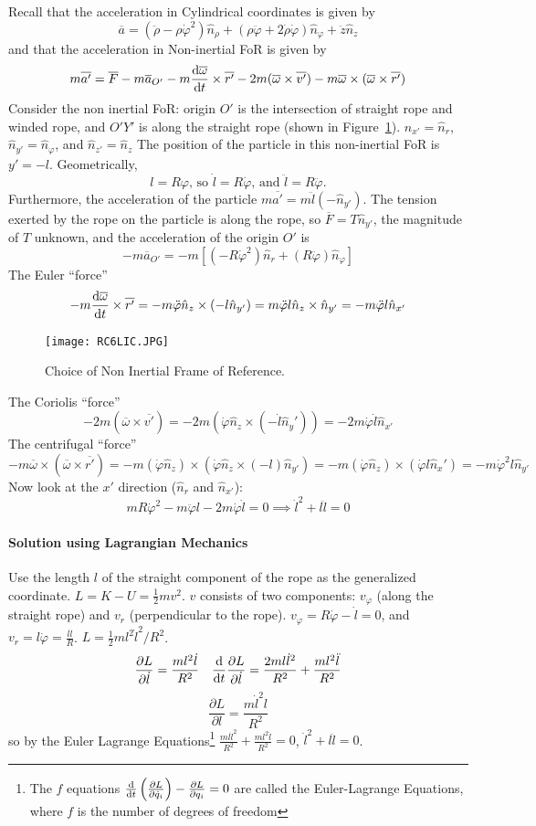 \documentclass[a4paper,12pt,titlepage]{article}
\begin{document}
Recall that the acceleration in Cylindrical coordinates is given by
\[\overline{a}=(\ddot\rho-\rho\dot\varphi^2)\hat n_\rho+(\rho\ddot\varphi+2\dot\rho\dot\varphi)\hat n_\varphi+\ddot z\hat n_z\]
and that the acceleration in Non-inertial FoR is given by
\[m\overline{a'}=\overline{F}-m\overline{a}_{O'}-m\frac{\mathrm{d}\overline{\omega}}{\mathrm{d} t}\times\overline{r'}-2m(\overline{\omega}\times\overline{v'})-m\overline{\omega}\times(\overline{\omega}\times\overline{r'})\]
Consider the non inertial FoR: origin $O'$ is the intersection of  straight rope and winded rope, and $O'Y'$ is along the straight rope (shown in Figure~\ref{fig:niforropecylinder}). $\hat{n}_{x'}=\hat{n}_r$, $\hat{n}_{y'}=\hat{n}_{\varphi}$, and $\hat{n}_{z'}=\hat{n}_{z}$ The position of the particle in this non-inertial FoR is $y'=-l$. Geometrically, \[l=R\varphi\text{, so }\dot l=R\dot\varphi\text{, and }\ddot l=R\ddot \varphi.\] Furthermore, the acceleration of the particle $m\overline{a'}=m\ddot l(-\hat n_{y'})$. The tension exerted by the rope on the particle is along the rope, so $\overline F=T\hat{n}_{y'}$, the magnitude of $T$ unknown, and the acceleration of the origin $O'$ is \[-m\overline{a}_{O'}=-m[(-R\dot\varphi ^2)\hat n_r+(R\ddot \varphi)\hat n_\varphi]\]
The Euler ``force''
\[-m\frac{\mathrm{d}\overline{\omega}}{\mathrm{d} t}\times\overline{r'}=-m\ddot\varphi\hat n_z\times (-l\hat n_{y'})=m\ddot\varphi l\hat n_z\times\hat n_{y'}=-m\ddot\varphi l\hat n_{x'}\]
\begin{figure}[H]
\centering
\texttt{[image: RC6LIC.JPG]}
\caption{Choice of Non Inertial Frame of Reference.}
\label{fig:niforropecylinder}
\end{figure}
The Coriolis ``force''
\[-2m(\overline{\omega}\times\overline{v'})=-2m(\dot\varphi\hat n_z\times (-\dot l\hat n_y'))=-2m\dot\varphi\dot l\hat n_{x'}\]
The centrifugal ``force''
\[-m\overline{\omega}\times(\overline\omega\times\overline{r'})=-m(\dot\varphi\hat n_z)\times(\dot\varphi\hat n_z\times (-l)\hat n_{y'})=-m(\dot\varphi\hat n_z)\times(\dot\varphi l\hat n_x')=-m\dot\varphi ^2l\hat n_{y'}\]
Now look at the $x'$ direction ($\hat n_r$ and $\hat n_{x'}$):
\[mR\dot\varphi^2-m\ddot\varphi l-2m\dot\varphi\dot l=0\implies \dot {l}^2+l\ddot {l}=0\]
\paragraph{Solution using Lagrangian Mechanics}
Use the length $l$ of the straight component of the rope as the generalized coordinate. $L=K-U=\frac{1}{2}mv^2$. $v$ consists of two components: $v_\varphi$ (along the straight rope) and $v_r$ (perpendicular to the rope). $v_\varphi=R\dot\varphi-\dot l=0$, and $v_r=l\dot\varphi=\frac{l\dot l}{R}$. $L=\frac{1}{2}ml^2\dot{l}^2/R^2$.
\[\frac{\partial L}{\partial \dot{l}}=\frac{ml^2\dot l}{R^2}\quad \frac{\mathrm{d}}{\mathrm{d} t}\frac{\partial L}{\partial \dot{l}}=\frac{2ml\dot{l}^2}{R^2}+\frac{ml^2\ddot l}{R^2}\]
\[\frac{\partial L}{\partial l}=\frac{m\dot{l}^2l}{R^2}\]
so by the Euler Lagrange Equations\footnote{The $f$ equations
$\frac{\mathrm{d}}{\mathrm{d} t}\left(\frac{\partial L}{\partial\dot q_i}\right)-\frac{\partial L}{\partial q_i}=0$
are called the Euler-Lagrange Equations, where $f$ is the number of degrees of freedom} $\frac{ml\dot{l}^2}{R^2}+\frac{ml^2\ddot l}{R^2}=0$, $\dot{l}^2+l\ddot{l}=0$.
\end{document}
